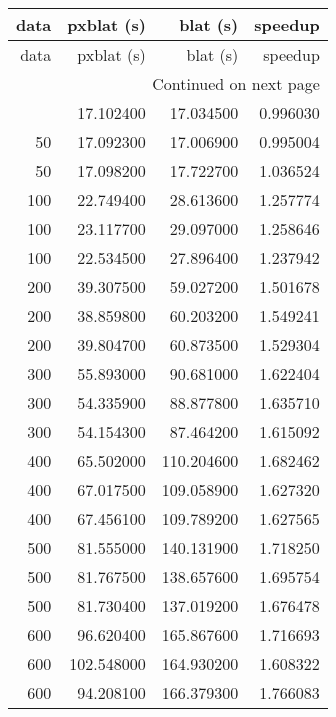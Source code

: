 \begin{longtable}{rrrr}
\toprule
data & pxblat (s) & blat (s) & speedup \\
\midrule
\endfirsthead
\toprule
data & pxblat (s) & blat (s) & speedup \\
\midrule
\endhead
\midrule
\multicolumn{4}{r}{Continued on next page} \\
\midrule
\endfoot
\bottomrule
\endlastfoot
50 & 17.102400 & 17.034500 & 0.996030 \\
50 & 17.092300 & 17.006900 & 0.995004 \\
50 & 17.098200 & 17.722700 & 1.036524 \\
100 & 22.749400 & 28.613600 & 1.257774 \\
100 & 23.117700 & 29.097000 & 1.258646 \\
100 & 22.534500 & 27.896400 & 1.237942 \\
200 & 39.307500 & 59.027200 & 1.501678 \\
200 & 38.859800 & 60.203200 & 1.549241 \\
200 & 39.804700 & 60.873500 & 1.529304 \\
300 & 55.893000 & 90.681000 & 1.622404 \\
300 & 54.335900 & 88.877800 & 1.635710 \\
300 & 54.154300 & 87.464200 & 1.615092 \\
400 & 65.502000 & 110.204600 & 1.682462 \\
400 & 67.017500 & 109.058900 & 1.627320 \\
400 & 67.456100 & 109.789200 & 1.627565 \\
500 & 81.555000 & 140.131900 & 1.718250 \\
500 & 81.767500 & 138.657600 & 1.695754 \\
500 & 81.730400 & 137.019200 & 1.676478 \\
600 & 96.620400 & 165.867600 & 1.716693 \\
600 & 102.548000 & 164.930200 & 1.608322 \\
600 & 94.208100 & 166.379300 & 1.766083 \\
\end{longtable}
